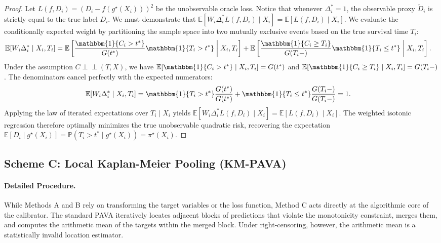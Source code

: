 \documentclass[11pt]{article}
\theoremstyle{plain}
\theoremstyle{plain}
\theoremstyle{plain}
\theoremstyle{plain}
\theoremstyle{plain}
\theoremstyle{plain}
\theoremstyle{plain}
\begin{document}
{\begin{proof}
Let $L(f, D_i) = (D_i - f(g^\star(X_i)))^2$ be the unobservable oracle loss. Notice that whenever $\Delta_i^\ast = 1$, the observable proxy $\tilde{D}_i$ is strictly equal to the true label $D_i$. We must demonstrate that $\mathbb{E}[W_i \Delta_i^\ast L(f, D_i) \mid X_i] = \mathbb{E}[L(f, D_i) \mid X_i]$. We evaluate the conditionally expected weight by partitioning the sample space into two mutually exclusive events based on the true survival time $T_i$:
\begin{align*}
    \mathbb{E}[W_i \Delta_i^\ast \mid X_i, T_i] 
    &= \mathbb{E}\left[ \frac{\mathbbm{1}\{C_i > t^*\}}{G(t^*)} \mathbbm{1}\{T_i > t^*\} \;\middle|\; X_i, T_i \right] + \mathbb{E}\left[ \frac{\mathbbm{1}\{C_i \ge T_i\}}{G(T_i-)} \mathbbm{1}\{T_i \le t^*\} \;\middle|\; X_i, T_i \right].
\end{align*}
Under the assumption $C \perp\!\!\!\perp (T,X)$, we have $\mathbb{E}[\mathbbm{1}\{C_i > t^*\} \mid X_i, T_i] = G(t^*)$ and $\mathbb{E}[\mathbbm{1}\{C_i \ge T_i\} \mid X_i, T_i] = G(T_i-)$. The denominators cancel perfectly with the expected numerators:
\begin{align*}
    \mathbb{E}[W_i \Delta_i^\ast \mid X_i, T_i] 
    &= \mathbbm{1}\{T_i > t^*\} \frac{G(t^*)}{G(t^*)} + \mathbbm{1}\{T_i \le t^*\} \frac{G(T_i-)}{G(T_i-)} = 1.
\end{align*}
Applying the law of iterated expectations over $T_i \mid X_i$ yields $\mathbb{E}[W_i \Delta_i^\ast L(f, D_i) \mid X_i] = \mathbb{E}[L(f, D_i) \mid X_i]$. The weighted isotonic regression therefore optimally minimizes the true unobservable quadratic risk, recovering the expectation $\mathbb{E}[D_i \mid g^\star(X_i)] = \mathbb{P}(T_i > t^* \mid g^\star(X_i)) = \pi^\star(X_i)$.
\end{proof}


\subsection{Scheme C: Local Kaplan-Meier Pooling (KM-PAVA)}

\paragraph{Detailed Procedure.}
While Methods A and B rely on transforming the target variables or the loss function, Method C acts directly at the algorithmic core of the calibrator. The standard PAVA iteratively locates adjacent blocks of predictions that violate the monotonicity constraint, merges them, and computes the arithmetic mean of the targets within the merged block. Under right-censoring, however, the arithmetic mean is a statistically invalid location estimator. 

}
\end{document}

